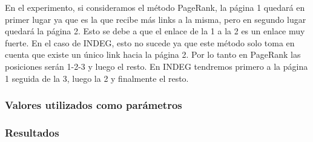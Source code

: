 		En el experimento, si consideramos el método PageRank, la página 1 quedará en primer lugar ya que es la que recibe más links a la misma, pero en segundo lugar quedará la página 2. Esto se debe a que el enlace de la 1 a la 2 es un enlace muy fuerte. En el caso de INDEG, esto no sucede ya que este método solo toma en cuenta que existe un único link hacia la página 2. Por lo tanto en PageRank las posiciones serán 1-2-3 y luego el resto. En INDEG tendremos primero a la página 1 seguida de la 3, luego la 2 y finalmente el resto.

		\subsubsection*{Valores utilizados como parámetros}
		 		

		\subsubsection*{Resultados}



